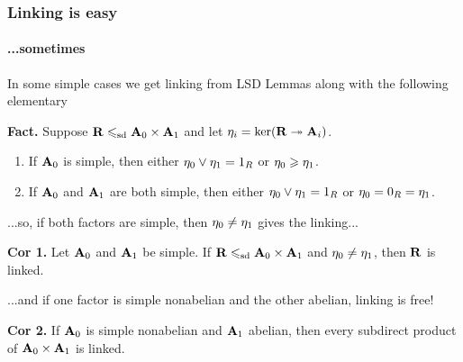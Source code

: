 \documentclass[xcolor=dvipsnames,9pt,hide notes,mathserif]{beamer}
\renewcommand{\alert}[1]{\textcolor{olivegreen}{#1}}
\renewcommand{\emph}[1]{\alert{{\it #1}}}
\begin{document}
\begin{frame} \frametitle{Linking is easy}
  \framesubtitle{...sometimes}
  In some simple cases we get linking from LSD Lemmas along with 
  the following elementary

  \bigskip
  
  {\bf Fact.}  Suppose $\mathbf{R} \leqslant_{\mathrm{sd}} \mathbf{A}_0 \times \mathbf{A}_1$ and let $\eta_i = \ker(\mathbf{R} \twoheadrightarrow \mathbf{A}_i)$.
    \begin{enumerate}
    \item 
      If $\mathbf{A}_0$ is simple, then either $\eta_0 \vee \eta_1 = 1_R$ or $\eta_0 \geqslant \eta_1$.
    \item If $\mathbf{A}_0$ and $\mathbf{A}_1$ are both simple, then either $\eta_0 \vee \eta_1 = 1_R$
      or $\eta_0 = 0_R = \eta_1$.
    \end{enumerate}
  
  \bigskip
  ...so, if both factors are simple, then $\eta_0 \neq \eta_1$ gives the linking...

  \bigskip
{\bf Cor 1.}    Let $\mathbf{A}_0$ and $\mathbf{A}_1$ be simple. If  $\mathbf{R} \leqslant_{\mathrm{sd}} \mathbf{A}_0\times \mathbf{A}_1$
and $\eta_0 \neq \eta_1$, then $\mathbf{R}$ is linked.

  \bigskip

...and if one factor is simple nonabelian and the other abelian, linking is free! 

  \bigskip
{\bf Cor 2.}  If $\mathbf{A}_0$ is simple nonabelian and $\mathbf{A}_1$ abelian, then
    every subdirect product of $\mathbf{A}_0 \times \mathbf{A}_1$ is linked.


\end{frame}

\end{document}

